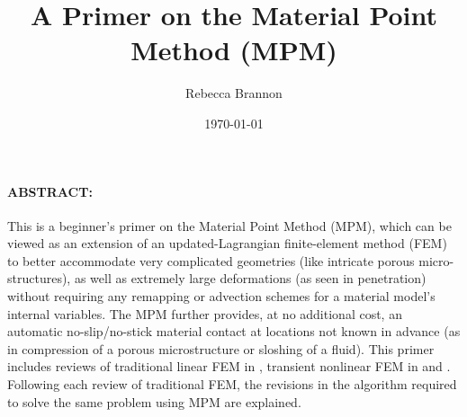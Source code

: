 





\title{A Primer on the Material Point Method (MPM)}
\author{Rebecca Brannon}
\date{\mydate\today}
\begin{minipage}[h]{\textwidth}
    \maketitle
\end{minipage}
\vspace{1cm}

\begin{MyAbstract}
\paragraph{ABSTRACT:}
This \manuscript is a beginner's primer on the Material Point Method (MPM), which can be viewed as an extension of an updated-Lagrangian finite-element method (FEM) to better accommodate very complicated geometries (like intricate porous micro-structures), as well as extremely large deformations (as seen in penetration) without requiring any remapping or advection schemes for a material model's internal variables. The MPM further provides, at no additional cost, an automatic no-slip/no-stick material contact at locations not known in advance (as in compression of a porous microstructure or sloshing of a fluid).  This primer includes reviews of traditional linear FEM in \oneD, transient nonlinear FEM in \oneD and \twoD.  Following each review of traditional FEM, the revisions in the algorithm required to solve the same problem using MPM are explained.

\end{MyAbstract}






\begin{comment}
\begin{acknowledgements}
The need to write this primer became clear in August 2013, when Steve Schmidt, as student in the Computational Solid Mechanics (CSM) group at the University of Utah asked a well-known MPM researcher, Jim Guilkey, if there were any good books about the MPM.  Jim replied that he was not aware of any good books on this topic. After a pause, he added ``at least there aren't any bad books on MPM either.'' A few minutes later, Steve sent Jim a screenshot of a book advertised by Barnes and Nobel booksellers under the title ``The Material Point Method.''  Within minutes, we realized that the two Russian ``authors'' were known to farm Wikipedia to create ``books'' that they didn't write themselves.  Therefore, thanks go to Barnes and Nobel for their failure to filter out this sort of sleazy publishing, prompting us to try writing an MPM book!
\end{acknowledgements}
\end{comment}

